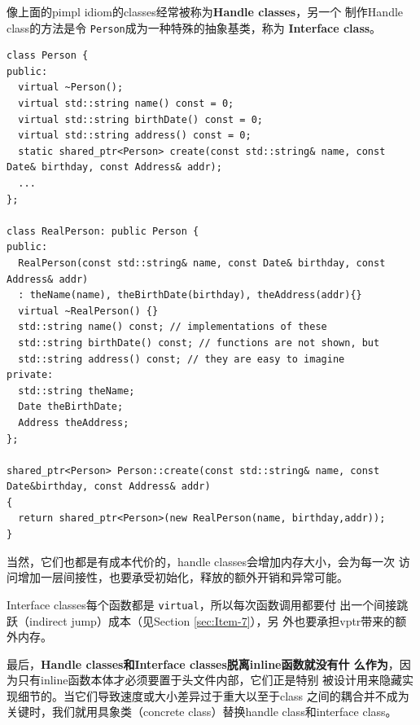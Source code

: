 \documentclass[a4paper,twoside]{article}
\theoremstyle{definition}
\theoremstyle{remark}
\numberwithin{equation}{section}
\let\OldTexttt\texttt
\renewcommand{\texttt}[1]{{\color{blue} \OldTexttt{#1}}}
\begin{document}
像上面的pimpl idiom的classes经常被称为\textbf{Handle classes}，另一个
制作Handle class的方法是令\texttt{Person}成为一种特殊的抽象基类，称为
\textbf{Interface class}。
\begin{verbatim}
class Person {
public:
  virtual ~Person();
  virtual std::string name() const = 0;
  virtual std::string birthDate() const = 0;
  virtual std::string address() const = 0;
  static shared_ptr<Person> create(const std::string& name, const Date& birthday, const Address& addr); 
  ...
};

class RealPerson: public Person {
public:
  RealPerson(const std::string& name, const Date& birthday, const Address& addr)
  : theName(name), theBirthDate(birthday), theAddress(addr){}
  virtual ~RealPerson() {}
  std::string name() const; // implementations of these
  std::string birthDate() const; // functions are not shown, but
  std::string address() const; // they are easy to imagine
private:
  std::string theName;
  Date theBirthDate;
  Address theAddress;
};

shared_ptr<Person> Person::create(const std::string& name, const Date&birthday, const Address& addr)
{
  return shared_ptr<Person>(new RealPerson(name, birthday,addr));
}
\end{verbatim}

当然，它们也都是有成本代价的，handle classes会增加内存大小，会为每一次
访问增加一层间接性，也要承受初始化，释放的额外开销和异常可能。

Interface classes每个函数都是\texttt{virtual}，所以每次函数调用都要付
出一个间接跳跃（indirect jump）成本（见Section \ref{sec:Item-7}），另
外也要承担vptr带来的额外内存。

最后，\textbf{Handle classes和Interface classes脱离inline函数就没有什
  么作为}，因为只有inline函数本体才必须要置于头文件内部，它们正是特别
被设计用来隐藏实现细节的。当它们导致速度或大小差异过于重大以至于class
之间的耦合并不成为关键时，我们就用具象类（concrete class）替换handle
class和interface class。

\end{document}
